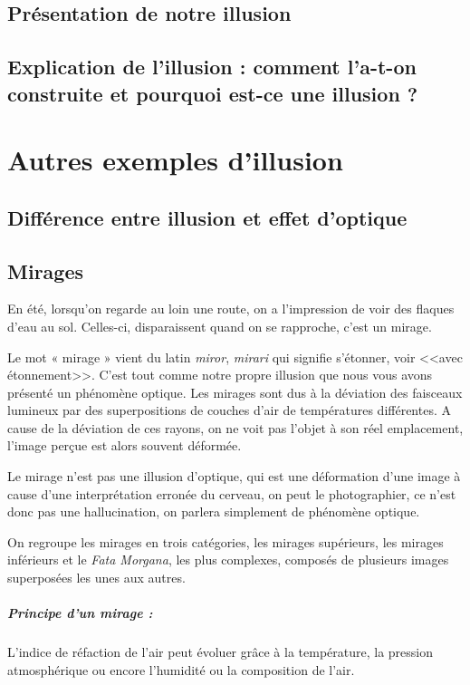\documentclass[a4paper, 12pt, onecolumn, openany]{report}
\begin{document}
	\section{Présentation de notre illusion}
	\section{Explication de l'illusion : comment l'a-t-on construite et pourquoi est-ce une illusion ?}
\chapter{Autres exemples d'illusion}
	\section{Différence entre illusion et effet d'optique}
	\section{Mirages}
	En été, lorsqu’on regarde au loin une route, on a l’impression de voir des flaques d’eau au sol. Celles-ci, disparaissent quand on se rapproche, c’est un mirage. 
	
	Le mot « mirage » vient du latin \textit{miror}, \textit{mirari} qui signifie s’étonner, voir <<avec étonnement>>. C’est tout comme notre propre illusion que nous vous avons présenté un phénomène optique. Les mirages sont dus à la déviation des faisceaux lumineux par des superpositions de couches d’air de températures différentes.  
A cause de la déviation de ces rayons, on ne voit pas l’objet à son réel emplacement, l’image perçue est alors souvent déformée. 
	
	Le mirage n’est pas une illusion d’optique, qui est une déformation d’une image à cause d’une interprétation erronée du cerveau, on peut le photographier, ce n’est donc pas une hallucination, on parlera simplement de phénomène optique. 
	
	On regroupe les mirages en trois catégories, les mirages supérieurs, les mirages inférieurs et le \textit{Fata Morgana}, les plus complexes, composés de plusieurs images superposées les unes aux autres. 

\paragraph{Principe d'un mirage :}
	L’indice de réfaction de l’air peut évoluer grâce à la température, la pression atmosphérique ou encore l’humidité ou la composition de l’air. 
\end{document}
